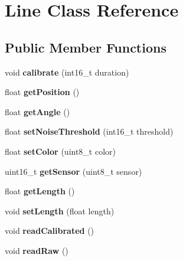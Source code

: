 \hypertarget{class_line}{}\section{Line Class Reference}
\label{class_line}
\subsection*{Public Member Functions}
\begin{DoxyCompactItemize}
\item 
\mbox{\label{class_line_a881d9279bdc8f59b5080f73ad00788e3}} 
void {\bfseries calibrate} (int16\+\_\+t duration)
\item 
\mbox{\label{class_line_aa0526da82dd7543ac75fc07ee3dbb31c}} 
float {\bfseries get\+Position} ()
\item 
\mbox{\label{class_line_ace99d3c925c8b71cb967188c029879e7}} 
float {\bfseries get\+Angle} ()
\item 
\mbox{\label{class_line_ad7e330a07e5db282314a9240b3081ba7}} 
float {\bfseries set\+Noise\+Threshold} (int16\+\_\+t threshold)
\item 
\mbox{\label{class_line_a372f6cc5b268b6baf3629b0042fbfee7}} 
float {\bfseries set\+Color} (uint8\+\_\+t color)
\item 
\mbox{\label{class_line_a972acaef656a4ddfe3bf3e82a2a0f493}} 
uint16\+\_\+t {\bfseries get\+Sensor} (uint8\+\_\+t sensor)
\item 
\mbox{\label{class_line_a72563901f4a04dc87ceacc7913655bb6}} 
float {\bfseries get\+Length} ()
\item 
\mbox{\label{class_line_aba3cf991fad6400a3d8735336c509344}} 
void {\bfseries set\+Length} (float length)
\item 
\mbox{\label{class_line_a1f1166d184eab9bc6a8445f20d1f26e3}} 
void {\bfseries read\+Calibrated} ()
\item 
\mbox{\label{class_line_aef792239bcba2dd7db1f71dfd608bd09}} 
void {\bfseries read\+Raw} ()
\end{DoxyCompactItemize}
